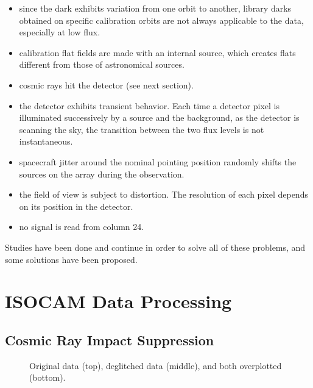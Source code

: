 \begin{itemize}

\item since the dark exhibits variation from one orbit to another, library 
darks obtained on specific calibration orbits are not always applicable to 
the data, especially at low flux. 

\item calibration flat fields are made with an internal source, which
creates flats different from those of astronomical sources.

\item cosmic rays hit the detector (see next section).

\item the detector exhibits transient behavior. Each time a
detector pixel is illuminated successively by a source and the
background, as the detector is scanning the sky, the transition
between the two flux levels is not instantaneous.

\item spacecraft jitter around the nominal pointing position randomly
shifts the sources on the array during the observation.

\item the field of view is subject to distortion. The resolution of each pixel depends on its 
position in the detector.
\item no signal is read from column 24.
\end{itemize}

Studies have been done and continue in order to solve all of these
problems, and some solutions have been proposed.


\chapter{ISOCAM Data Processing}

\section{Cosmic Ray Impact Suppression}
\label{sec:glitch}

\begin{figure}[htb]
\centerline{
\vbox{
}}
\caption{Original data (top), deglitched data (middle), and both overplotted 
(bottom).}
\label{fig_deglitch2}
\end{figure}
 
